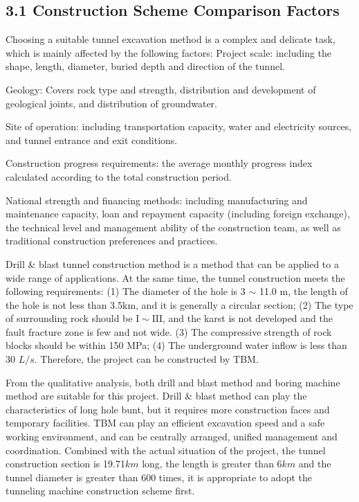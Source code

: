 \documentclass[11pt]{article}
\begin{document}
\subsection*{3.1 Construction Scheme Comparison Factors}
Choosing a suitable tunnel excavation method is a complex and delicate task, which is mainly affected by the following factors:
Project scale: including the shape, length, diameter, buried depth and direction of the tunnel.

Geology: Covers rock type and strength, distribution and development of geological joints, and distribution of groundwater.

Site of operation: including transportation capacity, water and electricity sources, and tunnel entrance and exit conditions.

Construction progress requirements: the average monthly progress index calculated according to the total construction period.

National strength and financing methods: including manufacturing and maintenance capacity, loan and repayment capacity (including foreign exchange), the technical level and management ability of the construction team, as well as traditional construction preferences and practices.

Drill \& blast tunnel construction method is a method that can be applied to a wide range of applications. At the same time, the tunnel construction meets the following requirements: (1) The diameter of the hole is 3 $\sim$ 11.0 m, the length of the hole is not less than 3.5km, and it is generally a circular section; (2) The type of surrounding rock should be $ \mathrm{I} \sim \mathrm{III} $, and the karst is not developed and the fault fracture zone is few and not wide. (3) The compressive strength of rock blocks should be within 150 MPa; (4) The underground water inflow is less than 30 $L/s$. Therefore, the project can be constructed by TBM.

From the qualitative analysis, both drill and blast method and boring machine method are suitable for this project. Drill \& blast method can play the characteristics of long hole bunt, but it requires more construction faces and temporary facilities. TBM can play an efficient excavation speed and a safe working environment, and can be centrally arranged, unified management and coordination. Combined with the actual situation of the project, the tunnel construction section is 19.71$km$ long, the length is greater than 6$km$ and the tunnel diameter is greater than 600 times, it is appropriate to adopt the tunneling machine construction scheme first.
\end{document}
